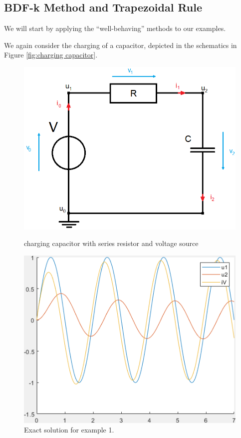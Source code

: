 \subsection{BDF-k Method and Trapezoidal Rule}	

	We will start by applying the ``well-behaving'' methods to our examples.
	
\begin{example1}
	We again consider the charging of a capacitor, depicted in the schematics in Figure \ref{fig:charging capacitor}.
	
	\begin{figure}[H]
		\centering
		\begin{minipage}{.5\textwidth}
			\centering
			\includegraphics[width=\linewidth]{pictures/Example1_simple_p2.png}
			\caption{charging capacitor with series resistor and voltage source}
			\label{fig:charging capacitor}
		\end{minipage}%
		\begin{minipage}{.5\textwidth}
			\centering
			\includegraphics[width=\linewidth]{pictures/exact_solution_ex1.png}
			\caption{Exact solution for example 1.}
			\label{fig: Exact solution for example 1}
		\end{minipage}
	\end{figure}
	

\end{example1}
